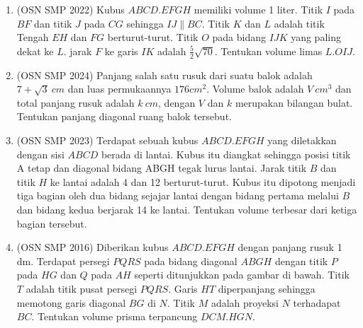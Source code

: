 \documentclass[12pt]{scrartcl}
\begin{document}
\begin{enumerate}
\begin{center}
    \end{center}

    \item (OSN SMP 2022) Kubus $ABCD.EFGH$ memiliki volume 1 liter. Titik $I$ pada $BF$ dan titik $J$ pada $CG$ sehingga $IJ \parallel BC$. Titik $K$ dan $L$ adalah titik Tengah $EH$ dan $FG$ berturut-turut. Titik $O$ pada bidang $IJK$ yang paling dekat ke $L$. jarak $F$ ke garis $IK$ adalah $\frac{5}{2}\sqrt{70}$. Tentukan volume limas $L.OIJ$.

    \newpage
    \item (OSN SMP 2024) Panjang salah satu rusuk dari suatu balok adalah $7 + \sqrt{3}~cm$ dan luas permukaannya $176 cm^2$. Volume balok adalah $V~cm^3$ dan total panjang rusuk adalah $k~cm$, dengan $V$ dan $k$ merupakan bilangan bulat. Tentukan panjang diagonal ruang balok tersebut.

    \item (OSN SMP 2023) Terdapat sebuah kubus $ABCD.EFGH$ yang diletakkan dengan sisi $ABCD$ berada di lantai. Kubus itu diangkat sehingga posisi titik A tetap dan diagonal bidang ABGH tegak lurus lantai. Jarak titik $B$ dan titik $H$ ke lantai adalah 4 dan 12 berturut-turut. Kubus itu dipotong menjadi tiga bagian oleh dua bidang sejajar lantai dengan bidang pertama melalui $B$ dan bidang kedua berjarak 14 ke lantai. Tentukan volume terbesar dari ketiga bagian tersebut.

    \item (OSN SMP 2016) Diberikan kubus $ABCD.EFGH$ dengan panjang rusuk 1 dm. Terdapat persegi $PQRS$ pada bidang diagonal $ABGH$ dengan titik $P$ pada $HG$ dan $Q$ pada $AH$ seperti ditunjukkan pada gambar di bawah. Titik $T$ adalah titik pusat persegi $PQRS$. Garis $HT$ diperpanjang sehingga memotong garis diagonal $BG$ di $N$. Titik $M$ adalah proyeksi $N$ terhadapat $BC$. Tentukan volume prisma terpancung $DCM.HGN$.
    \begin{center}
\end{center}
\end{enumerate}
\end{document}

